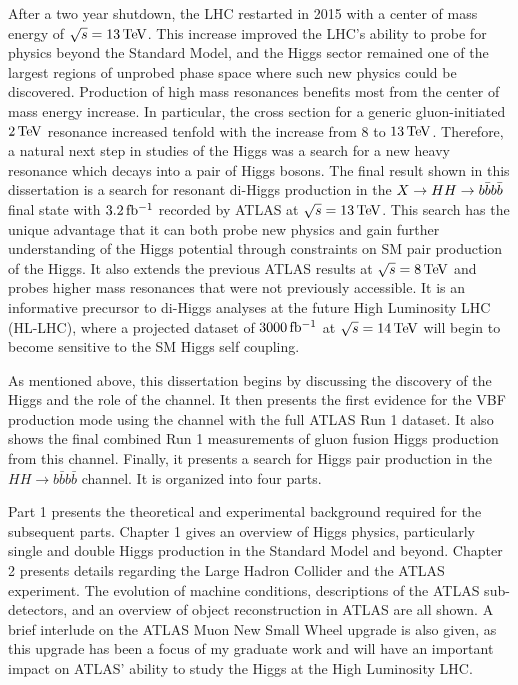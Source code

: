 After a two year shutdown, the LHC restarted in 2015 with a center of mass energy of $\sqrt{s} = 13 \TeV$. This increase improved the LHC's ability to probe for physics beyond the Standard Model, and the Higgs sector remained one of the largest regions of unprobed phase space where such new physics could be discovered. Production of high mass resonances benefits most from the center of mass energy increase. In particular, the cross section for a generic gluon-initiated $2 \TeV$ resonance increased tenfold with the increase from $8$ to $13 \TeV$. Therefore, a natural next step in studies of the Higgs was a search for a new heavy resonance which decays into a pair of Higgs bosons. The final result shown in this dissertation is a search for resonant di-Higgs production in the $X\to HH \to b\bar{b}b\bar{b}$ final state with $3.2 \mbox{\,fb$^{-1}$}$ recorded by ATLAS at $\sqrt{s} = 13 \TeV$. This search has the unique advantage that it can both probe new physics and gain further understanding of the Higgs potential through constraints on SM pair production of the Higgs. It also extends the previous ATLAS results at $\sqrt{s} = 8 \TeV$ and probes higher mass resonances that were not previously accessible. It is an informative precursor to di-Higgs analyses at the future High Luminosity LHC (HL-LHC), where a projected dataset of $3000 \mbox{\,fb$^{-1}$}$ at $\sqrt{s} = 14 \TeV$ will begin to become sensitive to the SM Higgs self coupling. 

As mentioned above, this dissertation begins by discussing the discovery of the Higgs and the role of the \HWWfull channel. It then presents the first evidence for the VBF production mode using the \HWWfull channel with the full ATLAS Run 1 dataset. It also shows the final combined Run 1 measurements of gluon fusion Higgs production from this channel. Finally, it presents a search for Higgs pair production in the $HH\to b\bar{b}b\bar{b}$ channel. It is organized into four parts. 

Part 1 presents the theoretical and experimental background required for the subsequent parts. Chapter 1 gives an overview of Higgs physics, particularly single and double Higgs production in the Standard Model and beyond. Chapter 2 presents details regarding the Large Hadron Collider and the ATLAS experiment. The evolution of machine conditions, descriptions of the ATLAS sub-detectors, and an overview of object reconstruction in ATLAS are all shown. A brief interlude on the ATLAS Muon New Small Wheel upgrade is also given, as this upgrade has been a focus of my graduate work and will have an important impact on ATLAS' ability to study the Higgs at the High Luminosity LHC. 

